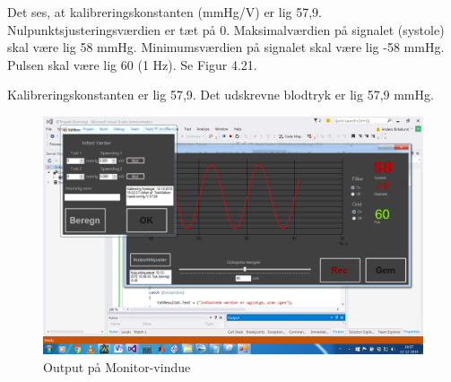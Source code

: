Det ses, at kalibreringskonstanten (mmHg/V) er lig 57,9.
Nulpunktsjusteringsværdien er tæt på 0.
Maksimalværdien på signalet (systole) skal være lig 58 mmHg.
Minimumsværdien på signalet skal være lig -58 mmHg. 
Pulsen skal være lig 60 (1 Hz).  Se Figur 4.21.

Kalibreringskonstanten er lig 57,9. Det udskrevne blodtryk er lig 57,9 mmHg.
\begin{figure}[H]
	\centering
	\includegraphics[width=1\textwidth]{Figurer/Test_Vis_2}
	\caption{Output på Monitor-vindue}
\end{figure}

